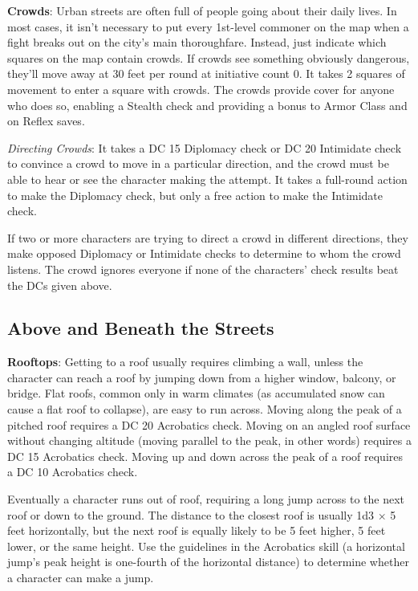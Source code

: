 \textbf{Crowds}: Urban streets are often full of people going about their daily lives. In most cases, it isn't necessary to put every 1st-level commoner on the map when a fight breaks out on the city's main thoroughfare. Instead, just indicate which squares on the map contain crowds. If crowds see something obviously dangerous, they'll move away at 30 feet per round at initiative count 0. It takes 2 squares of movement to enter a square with crowds. The crowds provide cover for anyone who does so, enabling a Stealth check and providing a bonus to Armor Class and on Reflex saves.
				
\textit{Directing Crowds}: It takes a DC 15 Diplomacy check or DC 20 Intimidate check to convince a crowd to move in a particular direction, and the crowd must be able to hear or see the character making the attempt. It takes a full-round action to make the Diplomacy check, but only a free action to make the Intimidate check.
				
If two or more characters are trying to direct a crowd in different directions, they make opposed Diplomacy or Intimidate checks to determine to whom the crowd listens. The crowd ignores everyone if none of the characters' check results beat the DCs given above.
				
\subsection{Above and Beneath the Streets}

				
\textbf{Rooftops}: Getting to a roof usually requires climbing a wall, unless the character can reach a roof by jumping down from a higher window, balcony, or bridge. Flat roofs, common only in warm climates (as accumulated snow can cause a flat roof to collapse), are easy to run across. Moving along the peak of a pitched roof requires a DC 20 Acrobatics check. Moving on an angled roof surface without changing altitude (moving parallel to the peak, in other words) requires a DC 15 Acrobatics check. Moving up and down across the peak of a roof requires a DC 10 Acrobatics check.
				
Eventually a character runs out of roof, requiring a long jump across to the next roof or down to the ground. The distance to the closest roof is usually 1d3 \mbox{$\times$} 5 feet horizontally, but the next roof is equally likely to be 5 feet higher, 5 feet lower, or the same height. Use the guidelines in the Acrobatics skill (a horizontal jump's peak height is one-fourth of the horizontal distance) to determine whether a character can make a jump.
				
